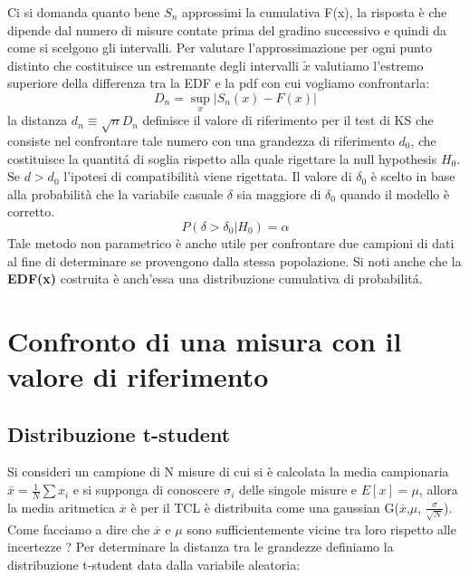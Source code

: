 \documentclass[11pt,a4paper]{book}
\begin{document}
Ci si domanda quanto bene $S_n$ approssimi la cumulativa F(x), la risposta \`{e} che dipende dal numero di misure contate prima del gradino successivo e quindi da come si scelgono gli intervalli. Per valutare l'approssimazione per ogni punto distinto che costituisce un estremante degli intervalli $\tilde{x}$ valutiamo l'estremo superiore della differenza tra la EDF e la pdf con cui vogliamo confrontarla:
\begin{equation*}
	D_n = \sup_{x} \vert S_n(x) -F(x) \vert 
\end{equation*}
 la distanza $d_n \equiv \sqrt{n}D_n$ definisce il valore di riferimento per il test di KS che consiste nel confrontare tale numero con una grandezza di riferimento $d_0$, che costituisce la quantit\'{a} di soglia rispetto alla quale rigettare la null hypothesis $H_0$. Se $d > d_0$ l'ipotesi di compatibilit\`{a} viene rigettata. Il valore di $\delta_0$ \`{e} scelto in base alla probabilit\`{a} che la variabile casuale $\delta$ sia maggiore di $\delta_0$ quando il modello \`{e} corretto.
 \begin{equation*}
 	P(\delta > \delta_0 \vert H_0) = \alpha
 \end{equation*}
Tale metodo non parametrico \`{e} anche utile per confrontare due campioni di dati al fine di determinare se provengono dalla stessa popolazione. Si noti anche che la \textbf{EDF(x)} costruita \`{e} anch'essa una distribuzione cumulativa di probabilit\'{a}.
 
 \section{Confronto di una misura con il valore di riferimento}
 
 \subsection{Distribuzione t-student}
 Si consideri un campione di N misure di cui si \`{e} calcolata la media campionaria $\overline{x} = \frac{1}{N} \sum x_i$ e si supponga di conoscere $\sigma_i$ delle singole misure e $E[x] = \mu$, allora la media aritmetica $\overline{x}$ \`{e} per il TCL \`{e} distribuita come una gaussian G($\overline{x}$,$\mu$, $\frac{\sigma}{\sqrt{N}}$). Come facciamo a dire che $\overline{x}$ e ${\mu}$ sono sufficientemente vicine tra loro rispetto alle incertezze ?
 \newline
 Per determinare la distanza tra le grandezze definiamo la distribuzione t-student data dalla variabile aleatoria:
 
\end{document}
